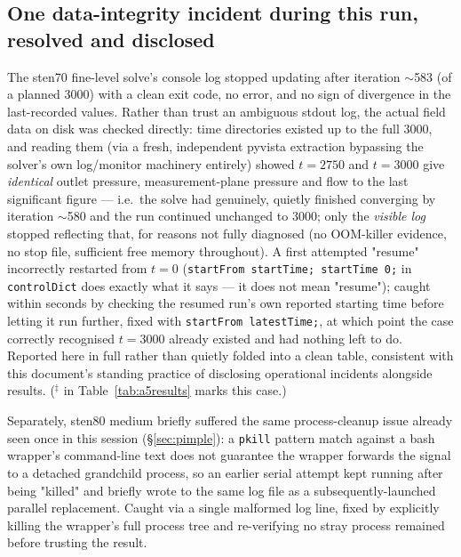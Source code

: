 \documentclass[11pt]{article}
\begin{document}
\subsection*{One data-integrity incident during this run, resolved and disclosed}
The sten70 fine-level solve's console log stopped updating after iteration $\sim$583 (of a planned
3000) with a clean exit code, no error, and no sign of divergence in the last-recorded values. Rather
than trust an ambiguous stdout log, the actual field data on disk was checked directly: time
directories existed up to the full 3000, and reading them (via a fresh, independent pyvista extraction
bypassing the solver's own log/monitor machinery entirely) showed $t{=}2750$ and $t{=}3000$ give
\emph{identical} outlet pressure, measurement-plane pressure and flow to the last significant figure
--- i.e.\ the solve had genuinely, quietly finished converging by iteration $\sim$580 and the
run continued unchanged to 3000; only the \emph{visible log} stopped reflecting that, for reasons not
fully diagnosed (no OOM-killer evidence, no stop file, sufficient free memory throughout). A first
attempted "resume" incorrectly restarted from $t{=}0$ (\texttt{startFrom startTime; startTime 0;} in
\texttt{controlDict} does exactly what it says --- it does not mean "resume"); caught within seconds
by checking the resumed run's own reported starting time before letting it run further, fixed with
\texttt{startFrom latestTime;}, at which point the case correctly recognised $t{=}3000$ already
existed and had nothing left to do. Reported here in full rather than quietly folded into a clean
table, consistent with this document's standing practice of disclosing operational incidents
alongside results. ($^\ddagger$ in Table~\ref{tab:a5results} marks this case.)

Separately, sten80 medium briefly suffered the same process-cleanup issue already seen once in this
session (\S\ref{sec:pimple}): a \texttt{pkill} pattern match against a bash wrapper's command-line
text does not guarantee the wrapper forwards the signal to a detached grandchild process, so an
earlier serial attempt kept running after being "killed" and briefly wrote to the same log file as a
subsequently-launched parallel replacement. Caught via a single malformed log line, fixed by
explicitly killing the wrapper's full process tree and re-verifying no stray process remained before
trusting the result.
\end{document}
